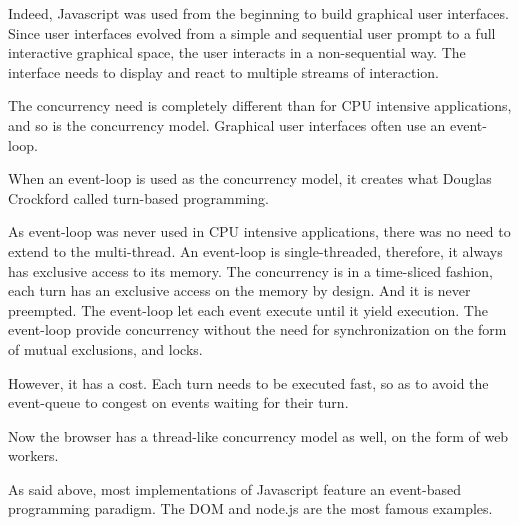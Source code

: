 Indeed, Javascript was used from the beginning to build graphical user interfaces.
Since user interfaces evolved from a simple and sequential user prompt to a full interactive graphical space, the user interacts in a non-sequential way.
The interface needs to display and react to multiple streams of interaction.

The concurrency need is completely different than for CPU intensive applications, and so is the concurrency model.
Graphical user interfaces often use an event-loop.

When an event-loop is used as the concurrency model, it creates what Douglas Crockford called turn-based programming.

As event-loop was never used in CPU intensive applications, there was no need to extend to the multi-thread.
An event-loop is single-threaded, therefore, it always has exclusive access to its memory.
The concurrency is in a time-sliced fashion, each turn has an exclusive access on the memory by design.
And it is never preempted.
The event-loop let each event execute until it yield execution.
The event-loop provide concurrency without the need for synchronization on the form of mutual exclusions, and locks.

However, it has a cost.
Each turn needs to be executed fast, so as to avoid the event-queue to congest on events waiting for their turn.




Now the browser has a thread-like concurrency model as well, on the form of web workers.


As said above, most implementations of Javascript feature an event-based programming paradigm.
The DOM and node.js are the most famous examples.


